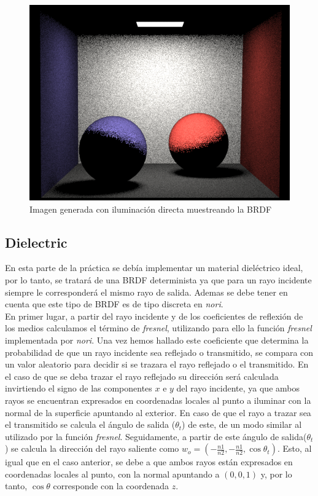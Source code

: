 \documentclass[10pt,oneside,a4paper]{article}
\begin{document}
\begin{figure}[h]
\centering
\includegraphics[width=.6\linewidth]{images/cbox_direct_mats_diff_512.png}
\caption{Imagen generada con iluminación directa muestreando la BRDF}
\label{fig:disp}
\end{figure}


\subsection{Dielectric}
En esta parte de la práctica se debía implementar un material dieléctrico ideal, por lo tanto, se tratará de una BRDF determinista ya que para un rayo incidente siempre le corresponderá el mismo rayo de salida. Ademas se debe tener en cuenta que este tipo de BRDF es de tipo discreta en \textit{nori}.\\

En primer lugar, a partir del rayo incidente y de los coeficientes de reflexión de los medios calculamos el término de \textit{fresnel}, utilizando para ello la función \textit{fresnel} implementada por \textit{nori}. Una vez hemos hallado este coeficiente que determina la probabilidad de que un rayo incidente sea reflejado o transmitido, se compara con un valor aleatorio para decidir si se trazara el rayo reflejado o el transmitido. En el caso de que se deba trazar el rayo reflejado su dirección será calculada invirtiendo el signo de las componentes $x$ e $y$ del rayo incidente, ya que ambos rayos se encuentran expresados en coordenadas locales al punto a iluminar con la normal de la superficie apuntando al exterior. En caso de que el rayo a trazar sea el transmitido se calcula el ángulo de salida ($\theta_t$) de este, de un modo similar al utilizado por la función \textit{fresnel}. Seguidamente, a partir de este ángulo de salida($\theta_t$) se calcula la dirección del rayo saliente como
 $ w_o = (-\frac{n1}{n2},-\frac{n1}{n2},\cos\theta_t)$. Esto, al igual que en el caso anterior, se debe a que ambos rayos están expresados en coordenadas locales al punto, con la normal apuntando a $(0,0,1)$ y, por lo tanto, $\cos\theta$ corresponde con la coordenada $z$.\\
 
\end{document}
